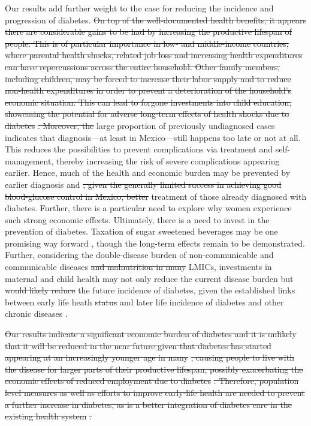 \documentclass[12pt,english]{article}
\providecommand{\DIFaddtex}[1]{{\protect\color{blue}\uwave{#1}}} %
\providecommand{\DIFdeltex}[1]{{\protect\color{red}\sout{#1}}}                      %
\providecommand{\DIFaddbegin}{} %
\providecommand{\DIFaddend}{} %
\providecommand{\DIFdelbegin}{} %
\providecommand{\DIFdelend}{} %
\providecommand{\DIFadd}[1]{\texorpdfstring{\DIFaddtex{#1}}{#1}} %
\providecommand{\DIFdel}[1]{\texorpdfstring{\DIFdeltex{#1}}{}} %
\begin{document}
Our results add further weight to the case for reducing the incidence and progression of diabetes. \DIFdelbegin \DIFdel{On top of the well-documented health benefits, it appears there are considerable gains to be had by increasing the productive lifespan of people. This is of particular
importance in low- and middle-income countries, where parental health shocks, related job loss and increasing health expenditures can have repercussions across the entire household. Other family members, including children, may be forced to increase their labor supply and
to reduce non-health expenditures in order to prevent a deterioration of the household's economic situation. This can lead to forgone investments into child education, showcasing the potential for adverse long-term effects of health shocks due to diabetes }%
\DIFdel{. Moreover, the }\DIFdelend \DIFaddbegin \DIFadd{The }\DIFaddend large proportion of previously undiagnosed cases indicates that diagnosis---at least in Mexico---still happens too late or not at all. This reduces the possibilities to prevent complications via treatment and self-management, thereby increasing the risk of severe complications appearing earlier. Hence, much of the health and economic burden may be prevented by earlier diagnosis and \DIFdelbegin \DIFdel{, given the generally limited success in achieving good blood-glucose control in Mexico, better }\DIFdelend \DIFaddbegin \DIFadd{ensuing effective }\DIFaddend treatment of those already diagnosed with diabetes. Further, there is a particular need to explore why women experience such strong economic effects. Ultimately, there is a need to invest in the prevention of diabetes. Taxation of sugar sweetened beverages may be one promising way forward \parencite{Colchero2016}, though the long-term effects remain to be demonstrated. Further, considering the double-disease burden of non-communicable and communicable diseases \DIFdelbegin \DIFdel{and malnutrition in many }%
\DIFdelend \DIFaddbegin \DIFadd{in many }\ac{LMICs}\DIFaddend , investments in maternal and child health may not only reduce the current disease burden but \DIFdelbegin \DIFdel{would likely reduce }\DIFdelend \DIFaddbegin \DIFadd{also }\DIFaddend the future incidence of diabetes, given the established links between early life heath \DIFdelbegin \DIFdel{status }\DIFdelend and later life incidence of diabetes and other chronic diseases \parencite{Sotomayor2013,Hanson2012,Li2010b}.


\DIFdelbegin \DIFdel{Our results indicate a significant economic burden of diabetes and it is unlikely that it will be reduced in the near future given that diabetes has started appearing at an increasingly younger age in many }%
\DIFdel{, causing people to live with the disease for larger parts of their productive lifespan, possibly exacerbating the economic effects of reduced employment due to diabetes }%
\DIFdel{. Therefore, population level measures as well as efforts to improve early-life health are needed to prevent a further increase in diabetes, as is a better integration of diabetes care in the existing health system }%
\DIFdel{.
}%
\end{document}
